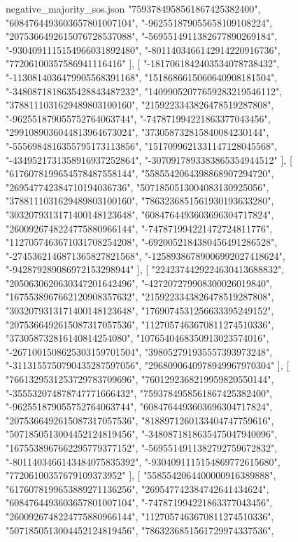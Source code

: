 \begin{filecontents*}[overwrite]{negative_majority_sos.json}
    "7593784958561867425382400",
    "6084764493603657801007104",
    "-962551879055658109108224",
    "2075366492615076728537088",
    "-5695514911382677890269184",
    "-9304091115154966031892480",
    "-8011403466142914220916736",
    "77206100357586941116416"
   ],
   [
    "-1817061842403534078738432",
    "-1130814036479905568391168",
    "1518686615060640908181504",
    "-3480871818635428843487232",
    "14099052077659283219546112",
    "3788111031629489803100160",
    "2159223343826478519287808",
    "-962551879055752764063744",
    "-747871994221863377043456",
    "2991089036044813964673024",
    "373058732815840084230144",
    "-5556984816355795173113856",
    "1517099621331147128045568",
    "-4349521731358916937252864",
    "-3070917893383865354944512"
   ],
   [
    "6176078199654578487558144",
    "5585542064398868907294720",
    "269547742384710194036736",
    "5071850513004083130925056",
    "3788111031629489803100160",
    "7863236851561930193633280",
    "3032079313171400148123648",
    "6084764493603696304717824",
    "2600926748224775880966144",
    "-747871994221472724811776",
    "1127057463671031708254208",
    "-6920052184380456491286528",
    "-2745362146871365827821568",
    "-12589386789006992027418624",
    "-942879289086972153298944"
   ],
   [
    "2242374429224630413688832",
    "2050630620630347201642496",
    "-427207279908300026019840",
    "1675538967662120908357632",
    "2159223343826478519287808",
    "3032079313171400148123648",
    "1769074531256633395249152",
    "2075366492615087317057536",
    "1127057463670811274510336",
    "373058732816140814254080",
    "1076540468350913023574016",
    "-2671001508625303159701504",
    "398052791935557393973248",
    "-3113155750790435287597056",
    "2968090640978949967970304"
   ],
   [
    "7661329531253729783709696",
    "7601292368219959820550144",
    "-355532074878747771666432",
    "7593784958561867425382400",
    "-962551879055752764063744",
    "6084764493603696304717824",
    "2075366492615087317057536",
    "8188971260133404747759616",
    "5071850513004452124819456",
    "-3480871818635475047940096",
    "1675538967662295779377152",
    "-5695514911382792759672832",
    "-8011403466143484075835392",
    "-9304091115154869772615680",
    "77206100357679109373952"
   ],
   [
    "5585542064400000916389888",
    "6176078199653889271136256",
    "269547742384742641434624",
    "6084764493603657801007104",
    "-747871994221863377043456",
    "2600926748224775880966144",
    "1127057463670811274510336",
    "5071850513004452124819456",
    "7863236851561729974337536",

\end{filecontents*}
